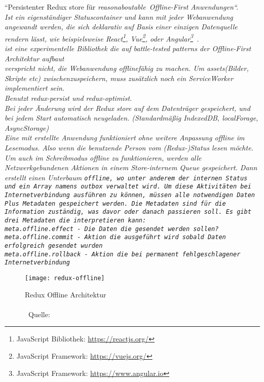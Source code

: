   ``Persistenter Redux store für \it{reasonaboutable}\texttrademark ~Offline-First Anwendungen``. \\
  Ist ein eigenständiger Statuscontainer und kann mit jeder Webanwendung angewandt werden, die sich \it{deklarativ auf Basis einer einzigen Datenquelle rendern lässt}, wie beispielsweise React\footnote{JavaScript Bibliothek: \url{https://reactjs.org/}}, Vue\footnote{JavaScript Framework: \url{https://vuejs.org/}}, oder Angular\footnote{JavaScript Framework: \url{https://www.angular.io}}~\cite{redux-offline-compabilaty}.\\
  ist eine experimentelle Bibliothek die auf \it{battle-tested} patterns der Offline-First Architektur aufbaut\\
   verspricht nicht, die Webanwendung offlinefähig zu machen. Um \it{assets}(Bilder, Skripte etc) zwischenzuspeichern, muss zusätzlich noch ein ServiceWorker implementiert sein.\\
  Benutzt redux-persist und redux-optimist.\\
  Bei jeder Änderung wird der Redux store auf dem Datenträger gespeichert, und bei jedem Start automatisch neugeladen. (Standardmäßig IndexedDB, localForage, AsyncStorage)\\
  Eine mit  erstellte Anwendung funktioniert ohne weitere Anpassung offline im Lesemodus. Also wenn die benutzende Person vom (Redux-)Status lesen möchte.
  Um auch im Schreibmodus offline zu funktionieren, werden alle Netzwerkgebundenen Aktionen in einem Store-internem \gls{Queue} gespeichert. Dann erstellt  einen Unterbaum \tt{offline}, wo unter anderem der internen Status und ein Array namens \tt{outbox} verwaltet wird. Um diese Aktivitäten bei Internetverbindung ausführen zu können, müssen alle notwendigen Daten Plus Metadaten gespeichert werden. Die Metadaten sind für die Information zuständig, was davor oder danach passieren soll. Es gibt drei Metadaten die  interpretieren kann:\\
  \tt{meta.offline.effect} - Die Daten die gesendet werden sollen?\\
  \tt{meta.offline.commit} - Aktion die ausgeführt wird sobald Daten erfolgreich gesendet wurden\\
  \tt{meta.offline.rollback} - Aktion die bei permanent fehlgeschlagener Internetverbindung
  ~\cite{redux-offline-gh}
  \begin{figure}[H]
    \centering
    \texttt{[image: redux-offline]}
    \grayRule
    \caption[Redux Offline]{Redux Offline Architektur\\\\~Quelle:~\cite{redux-offline}}
     \label{fig:redux-offline}
\end{figure}

